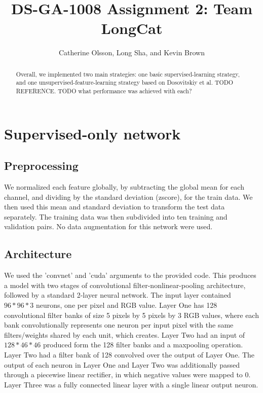 \documentclass{article} %
\title{DS-GA-1008 Assignment 2: Team LongCat}
\author{
Catherine Olsson, Long Sha, and Kevin Brown \\
}
\begin{document}
\maketitle

\begin{abstract}
Overall, we implemented two main strategies: one basic supervised-learning strategy, and one unsupervised-feature-learning strategy based on Dosovitskiy et al. TODO REFERENCE. TODO what performance was achieved with each?
\end{abstract}

\section{Supervised-only network}

\subsection{Preprocessing}

We normalized each feature globally, by subtracting the global mean for each
channel, and dividing by the standard deviation (zscore), for the train data.
We then used this mean and standard deviation to transform the test data
separately. The training data was then subdivided into ten training and validation
pairs. No data augmentation for this network were used. 

\subsection{Architecture}

We used the 'convnet' and 'cuda' arguments to the provided code. This produces
a model with two stages of convolutional filter-nonlinear-pooling architecture,
followed by a standard 2-layer neural network. The input layer contained
$96*96*3$ neurons, one per pixel and RGB value. Layer One has 128 convolutional
filter banks of size 5 pixels by 5 pixels by 3 RGB values, where each bank
convolutionally represents one neuron per input pixel with the same
filters/weights shared by each unit, which creates. Layer Two had an input of
$128*46*46$ produced form the 128 filter banks and a maxpooling operation.
Layer Two had a filter bank of 128 convolved over the output of Layer One.  The
output of each neuron in Layer One and Layer Two was additionally passed
through a piecewise linear rectifier, in which negative values were mapped to
0. Layer Three was a fully connected linear layer with a single linear output
neuron.  
\end{document}
